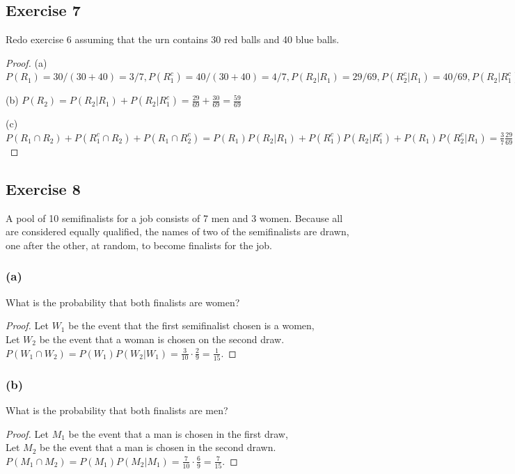 \documentclass[14pt]{extarticle}
\begin{document}
\subsection{Exercise 7}
Redo exercise 6 assuming that the urn contains 30 red balls and 40 blue balls.

\begin{proof}
     (a) \(P(R_1) = 30 / (30+40) = 3/7, P(R_1^c) = 40 / (30+40) = 4/7, P(R_2 | R_1) = 29/69, P(R_2^c | R_1) = 40/69, P(R_2 |
     R_1^c) = 30/69, P(R_2^c | R_1^c) = 39/69\)

     (b) \(P(R_2) = P(R_2 | R_1) + P(R_2 | R_1^c) = \frac{29}{69} + \frac{30}{69} = \frac{59}{69}\)

     (c) \(P(R_1 \cap R_2) + P(R_1^c \cap R_2) + P(R_1 \cap R_2^c) = P(R_1)P(R_2|R_1) + P(R_1^c)P(R_2|R_1^c) + P(R_1)P(R_2^c|R_1)
     = \frac{3}{7}\frac{29}{69} + \frac{4}{7}\frac{30}{69} + \frac{3}{7}\frac{40}{69} = \frac{3 \cdot 29 + 4 \cdot 30 +
          3 \cdot 40}{7 \cdot 69} = 327/483 = 0.677018634\)
\end{proof}

\subsection{Exercise 8}
A pool of 10 semifinalists for a job consists of 7 men and 3 women. Because all are considered equally qualified, the names
of two of the semifinalists are drawn, one after the other, at random, to become finalists for the job.

\subsubsection{(a)}
What is the probability that both finalists are women?
\begin{proof}
     Let \(W_1\) be the event that the first semifinalist chosen is a women, \\
     Let \(W_2\) be the event that a woman is chosen on the second draw. \\
     \(P(W_1 \cap W_2) = P(W_1)P(W_2 | W_1) = \frac{3}{10} \cdot \frac{2}{9} = \frac{1}{15}\).
\end{proof}

\subsubsection{(b)}
What is the probability that both finalists are men?
\begin{proof}
     Let \(M_1\) be the event that a man is chosen in the first draw, \\
     Let \(M_2\) be the event that a man is chosen in the second drawn. \\
     \(P(M_1 \cap M_2) = P(M_1)P(M_2 | M_1) = \frac{7}{10} \cdot \frac{6}{9} = \frac{7}{15}\).
\end{proof}
\end{document}
